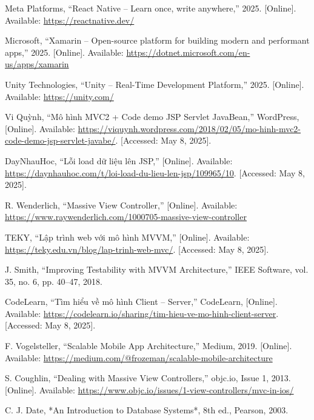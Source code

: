 \documentclass[12pt]{report}
\begin{document}
\begin{thebibliography}{1}
  Meta Platforms, ``React Native – Learn once, write anywhere,'' 2025. [Online]. Available: \url{https://reactnative.dev/}

  Microsoft, ``Xamarin – Open-source platform for building modern and performant apps,'' 2025. [Online]. Available: \url{https://dotnet.microsoft.com/en-us/apps/xamarin}

  Unity Technologies, ``Unity – Real-Time Development Platform,'' 2025. [Online]. Available: \url{https://unity.com/}

  Vi Quỳnh, “Mô hình MVC2 + Code demo JSP Servlet JavaBean,” WordPress, [Online]. Available: \url{https://viquynh.wordpress.com/2018/02/05/mo-hinh-mvc2-code-demo-jsp-servlet-javabe/}. [Accessed: May 8, 2025].

  DayNhauHoc, “Lỗi load dữ liệu lên JSP,” [Online]. Available: \url{https://daynhauhoc.com/t/loi-load-du-lieu-len-jsp/109965/10}. [Accessed: May 8, 2025].


  R. Wenderlich, ``Massive View Controller,'' [Online]. Available: \url{https://www.raywenderlich.com/1000705-massive-view-controller}

  TEKY, “Lập trình web với mô hình MVVM,” [Online]. Available: \url{https://teky.edu.vn/blog/lap-trinh-web-mvc/}. [Accessed: May 8, 2025].



  J. Smith, ``Improving Testability with MVVM Architecture,'' IEEE Software, vol. 35, no. 6, pp. 40–47, 2018.

  CodeLearn, “Tìm hiểu về mô hình Client – Server,” CodeLearn, [Online]. Available: \url{https://codelearn.io/sharing/tim-hieu-ve-mo-hinh-client-server}. [Accessed: May 8, 2025].


  F. Vogelsteller, ``Scalable Mobile App Architecture,'' Medium, 2019. [Online]. Available: \url{https://medium.com/@frozeman/scalable-mobile-architecture}

  S. Coughlin, ``Dealing with Massive View Controllers,'' objc.io, Issue 1, 2013. [Online]. Available: \url{https://www.objc.io/issues/1-view-controllers/mvc-in-ios/}
  

  C. J. Date, *An Introduction to Database Systems*, 8th ed., Pearson, 2003.
  

\end{thebibliography}
\end{document}
